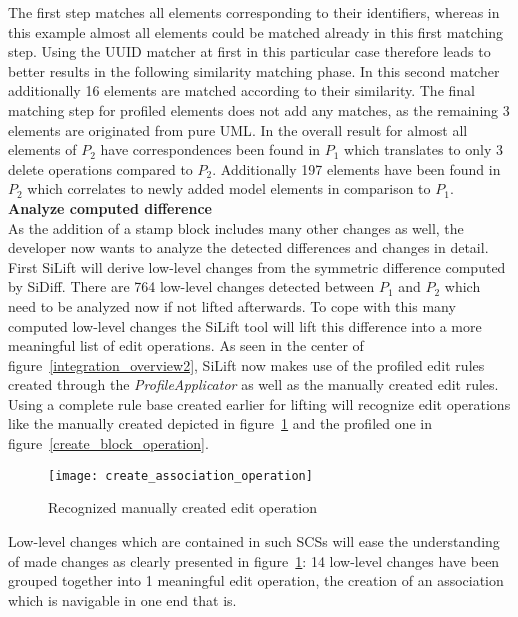 The first step matches all elements corresponding to their identifiers, whereas
in this example almost all elements could be matched already in this first
matching step. Using the \ac{UUID} matcher at first in this particular
case therefore leads to better results in the following similarity matching
phase. In this second matcher additionally 16 elements are matched according to their similarity. The final matching step for
profiled elements does not add any matches, as the remaining 3 elements are
originated from pure \ac{UML}. In the overall result for almost all elements of
$P_2$ have correspondences been found in $P_1$ which translates to only 3 delete
operations compared to $P_2$. Additionally 197 elements have been found in $P_2$
which correlates to newly added model elements in comparison to $P_1$. 
\newpage
\textbf{Analyze computed difference} \\
As the addition of a stamp block includes many other changes as well, the
developer now wants to analyze the detected differences and changes in detail.
First SiLift will derive low-level changes from the symmetric difference
computed by SiDiff. There are 764 low-level changes detected between $P_1$
and $P_2$ which need to be analyzed now if not lifted afterwards. To cope with
this many computed low-level changes the SiLift tool will lift this difference 
into a more meaningful list of edit operations. As seen in the center of
figure~\ref{integration_overview2}, SiLift now makes use of the profiled edit
rules created through the \textit{ProfileApplicator} as well as the manually
created edit rules. Using a complete rule base created earlier
for lifting will recognize edit operations like the manually created
depicted in figure~\ref{create_association_operation} and the profiled one in
figure~\ref{create_block_operation}.

\begin{figure}[h!]
\begin{center}
\texttt{[image: create\_association\_operation]}\\
\end{center}
\caption{Recognized manually created edit operation}
\label{create_association_operation}
\end{figure}

Low-level changes which are contained in such \ac{SCS}s will ease the
understanding of made changes as clearly presented in
figure~\ref{create_association_operation}: 14 low-level changes have been
grouped together into 1 meaningful edit operation, the creation of an
association which is navigable in one end that is.

